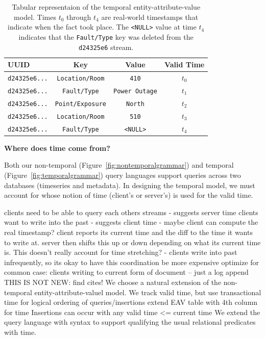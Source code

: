 \begin{table}
\centering
\begin{tabular}{|l|c|c|c|}
\hline
\textbf{UUID} & \textbf{Key} & \textbf{Value} & \textbf{Valid Time} \\
\hline
\texttt{d24325e6...} & \texttt{Location/Room} & \texttt{410} & $t_0$ \\
\texttt{d24325e6...} & \texttt{Fault/Type} & \texttt{Power Outage} & $t_1$ \\
\texttt{d24325e6...} & \texttt{Point/Exposure} & \texttt{North} & $t_2$ \\
\texttt{d24325e6...} & \texttt{Location/Room} & \texttt{510} & $t_3$ \\
\texttt{d24325e6...} & \texttt{Fault/Type} & \texttt{<NULL>} & $t_4$ \\
\hline
\end{tabular}
\caption{Tabular representaion of the temporal entity-attribute-value model. Times $t_0$ through $t_4$ are real-world timestamps
that indicate when the fact took place. The \texttt{<NULL>} value at time $t_4$ indicates that the \texttt{Fault/Type} key was deleted
from the \texttt{d24325e6} stream.}
\label{table:temporaleavexample}
\end{table}

\textbf{Where does time come from?}

Both our non-temporal (Figure~\ref{fig:nontemporalgrammar}) and temporal (Figure~\ref{fig:temporalgrammar}) query languages
support queries across two databases (timeseries and metadata). In designing the temporal model, we must account for
whose notion of time (client's or server's) is used for the valid time.

clients need to be able to query each others streams
    - suggests server time
clients want to write into the past
    - suggests client time
    - maybe client can compute the real timestamp?
        client reports its current time and the diff to the time it wants to write at.
        server then shifts this up or down depending on what its current time is.
        This doesn't really account for time stretching?
    - clients write into past infrequently, so its okay to have this coordination be more expensive
optimize for common case: clients writing to current form of document -- just a log append
\fi
{}
THIS IS NOT NEW: find cites!
We choose a natural extension of the non-temporal entity-attribute-valuel model.
We track valid time, but use transactional time for logical ordering of queries/insertions
extend EAV table with 4th column for time
Insertions can occur with any valid time <= current time
We extend the query language with syntax to support qualifying the usual
relational predicates with time. 
\fi


